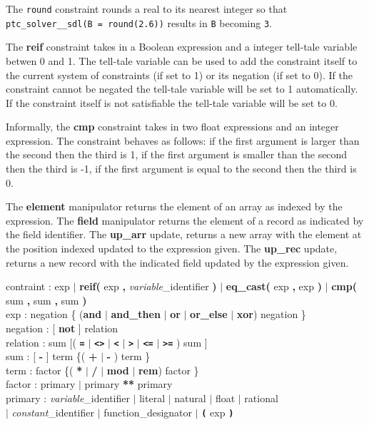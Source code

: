 \documentclass{article}
\begin{document}
The \texttt{round} constraint rounds a real to its nearest integer so that
\texttt{ptc\_solver\_\_sdl(B = round(2.6))} results in \texttt{B} becoming
\texttt{3}.

The \textbf{reif}
constraint takes in a Boolean expression and a integer tell-tale variable betwen
0 and 1.
The tell-tale variable can be used to add the constraint itself to the current
system of
constraints (if set to 1) or its negation (if set to 0). If the constraint cannot
be negated
the tell-tale variable will be set to 1 automatically. If the constraint itself
is not satisfiable
 the tell-tale variable will be set to 0.

Informally, the \textbf{cmp} constraint takes in two float expressions and an
integer
expression. The constraint behaves as follows: if the first argument is larger
than the
second then the third is 1, if the first argument is smaller than the second then
the
third is -1, if the first argument is equal to the second then the third is 0.

 The
\textbf{element} manipulator returns the element of an array as indexed by the
expression.
The \textbf{field} manipulator returns the element of a record as indicated by
the field
identifier. The \textbf{up\_arr} update, returns a new array with the element at
the
position indexed updated to the expression given. The \textbf{up\_rec} update,
returns a
new record with the indicated field updated by the expression given.


\begin{tabbing}
contraint : exp
$\mid$ \textbf{reif(} exp \textbf{, } \textit{variable}\_identifier \textbf{)}
$\mid$ \textbf{eq\_cast(} exp \textbf{, } exp \textbf{)}
$\mid$ \textbf{cmp(} sum \textbf{, } sum \textbf{, } sum \textbf{)} \\
exp : negation \{ (\textbf{and} $\mid$ \textbf{and\_then} $\mid$ \textbf{or}
$\mid$ \textbf{or\_else} $\mid$ \textbf{xor}) negation \} \\
negation : [ \textbf{not} ] relation \\
relation : sum [( \textbf{\texttt{=}} $\mid$ \textbf{\texttt{<>}} $\mid$
\textbf{\texttt{<}} $\mid$ \textbf{\texttt{>}} $\mid$ \textbf{\texttt{<=}} $\mid$
\textbf{\texttt{>=}} ) sum ] \\
sum : [ \textbf{-} ] term \{( \textbf{+} $\mid$ \textbf{-} ) term \} \\
term : factor \{( \textbf{*} $\mid$ \textbf{/} $\mid$ \textbf{mod} $\mid$
\textbf{rem}) factor \} \\
factor : primary $\mid$ primary \textbf{**} primary \\
primary : \= \textit{variable}\_identifier $\mid$ literal $\mid$ natural $\mid$
float $\mid$ rational \\
    \> $\mid$ \textit{constant}\_identifier $\mid$ function\_designator
$\mid$ \textbf{\texttt{(}} exp \textbf{\texttt{)}}
\end{tabbing}
\end{document}

